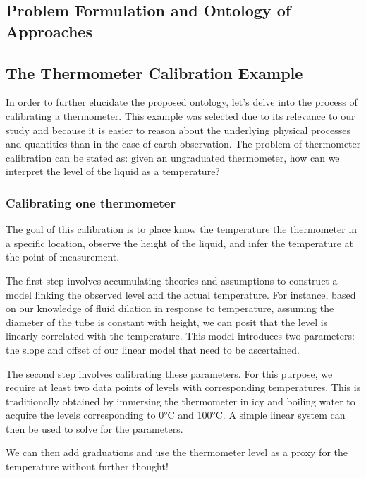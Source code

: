 \begin{bibunit}

\clearemptydoublepage
\chapter{Problem Formulation and Ontology of Approaches}
\label{chap:1}
\section{The Thermometer Calibration Example}

In order to further elucidate the proposed ontology, let's delve into the process of calibrating a thermometer. This example was selected due to its relevance to our study and because it is easier to reason about the underlying physical processes and quantities than in the case of earth observation. The problem of thermometer calibration can be stated as: given an ungraduated thermometer, how can we interpret the level of the liquid as a temperature?

\subsection{Calibrating one thermometer}

The goal of this calibration is to place know the temperature the thermometer in a specific location, observe the height of the liquid, and infer the temperature at the point of measurement.

The first step involves accumulating theories and assumptions to construct a model linking the observed level and the actual temperature. For instance, based on our knowledge of fluid dilation in response to temperature, assuming the diameter of the tube is constant with height, we can posit that the level is linearly correlated with the temperature. This model introduces two parameters: the slope and offset of our linear model that need to be ascertained.

The second step involves calibrating these parameters. For this purpose, we require at least two data points of levels with corresponding temperatures. This is traditionally obtained by immersing the thermometer in icy and boiling water to acquire the levels corresponding to 0°C and 100°C. A simple linear system can then be used to solve for the parameters.

We can then add graduations and use the thermometer level as a proxy for the temperature without further thought!



\end{bibunit}
